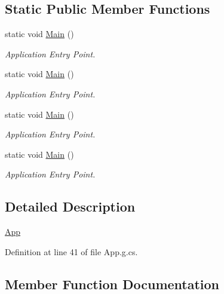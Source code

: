 \subsection*{Static Public Member Functions}
\begin{DoxyCompactItemize}
\item 
static void \hyperlink{class_reversi_wpf_1_1_app_a21f38c0f40a47a04302edeeb7bf005f8}{Main} ()
\begin{DoxyCompactList}\small\item\em Application Entry Point. \end{DoxyCompactList}\item 
static void \hyperlink{class_reversi_wpf_1_1_app_a21f38c0f40a47a04302edeeb7bf005f8}{Main} ()
\begin{DoxyCompactList}\small\item\em Application Entry Point. \end{DoxyCompactList}\item 
static void \hyperlink{class_reversi_wpf_1_1_app_a21f38c0f40a47a04302edeeb7bf005f8}{Main} ()
\begin{DoxyCompactList}\small\item\em Application Entry Point. \end{DoxyCompactList}\item 
static void \hyperlink{class_reversi_wpf_1_1_app_a21f38c0f40a47a04302edeeb7bf005f8}{Main} ()
\begin{DoxyCompactList}\small\item\em Application Entry Point. \end{DoxyCompactList}\end{DoxyCompactItemize}


\subsection{Detailed Description}
\hyperlink{class_reversi_wpf_1_1_app}{App} 



Definition at line 41 of file App.\+g.\+cs.



\subsection{Member Function Documentation}
\mbox{\label{class_reversi_wpf_1_1_app_a30ccf063a596c89bd03747d60a96d084}} 
